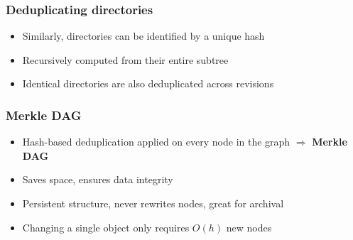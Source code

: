 \documentclass[aspectratio=169,xcolor=table]{beamer}
\begin{document}
    \begin{frame}
        \frametitle{Deduplicating directories}
        \begin{block}{}
            \begin{itemize}
                \item Similarly, directories can be identified by a unique hash
                \item Recursively computed from their entire subtree
                \item Identical directories are also deduplicated across
                    revisions
            \end{itemize}
        \end{block}
        \vfill
        \begin{figure}
            \centering
            \scalebox{0.8}{}
        \end{figure}
    \end{frame}

    \begin{frame}
        \frametitle{Merkle DAG}
        \begin{block}{}
            \begin{itemize}
                \item Hash-based deduplication applied on every node in the graph
                    $\Rightarrow$ \textbf{Merkle DAG}
                \item Saves space, ensures data integrity
                \item Persistent structure, never rewrites nodes, great for
                    archival
                \item Changing a single object only requires
                    $O(h)$ new nodes
            \end{itemize}
        \end{block}
        \vfill
        \begin{figure}
            \centering
            \scalebox{0.8}{}
        \end{figure}
    \end{frame}
\end{document}

